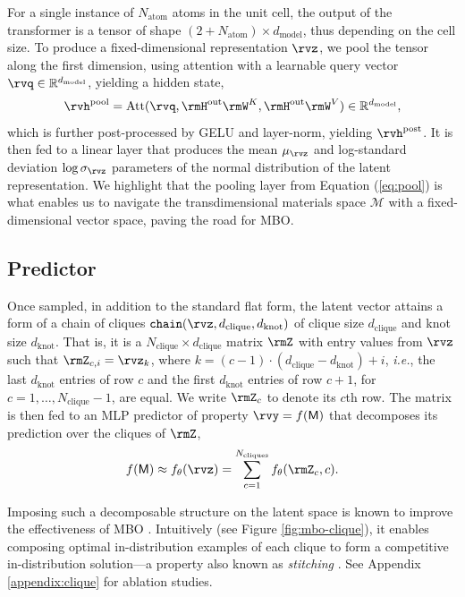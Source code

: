 \documentclass{article}
\theoremstyle{plain}
\theoremstyle{definition}
\theoremstyle{remark}
\begin{document}
For a single instance of $N_{\text{atom}}$ atoms in the unit cell, the output of the transformer is a tensor of shape $(2+N_{\text{atom}})\times d_{\text{model}}$, thus depending on the cell size. 
To produce a fixed-dimensional representation $\rvz$, we pool the tensor along the first dimension, using attention with a learnable query vector $\rvq\in\mathbb{R}^{d_{\text{model}}}$, yielding a hidden state,
\begin{align}   
    \label{eq:pool}
    \rvh^{\text{pool}} = \operatorname{Att}(\rvq, \rmH^{\text{out}}\rmW^{K}, \rmH^{\text{out}}\rmW^{V}) \in\mathbb{R}^{d_{\text{model}}},
\end{align}
which is further post-processed by GELU \citep{hendrycks2016gaussian} and layer-norm, yielding $\rvh^{\text{post}}$.
It is then fed to  a linear layer that produces the mean $\mu_{\rvz}$ and log-standard deviation $\log \sigma_{\rvz}$ parameters of the normal distribution of the latent representation.
We highlight that the pooling layer from Equation (\ref{eq:pool}) is what enables us to navigate the transdimensional materials space $\mathcal{M}$ with a fixed-dimensional vector space, paving the road for MBO.


\subsection{Predictor}
\label{sub:pred}
Once sampled, in addition to the standard flat form, the latent vector attains a form of a chain of cliques $\texttt{chain}(\rvz, d_{\text{clique}}, d_{\text{knot}})$ of clique size $d_{\text{clique}}$ and knot size $d_{\text{knot}}$. 
That is, it is a $N_{\text{clique}}\times d_{\text{clique}}$ matrix $\rmZ$ with entry values from $\rvz$ such that $\rmZ_{c,i}=\rvz_{k}$, where $k=(c-1)\cdot (d_{\text{clique}}-d_{\text{knot}}) + i$, \emph{i.e.}, the last $d_{\text{knot}}$ entries of row $c$ and the first $d_{\text{knot}}$ entries of row $c+1$, for $c=1, \dots, N_{\text{clique}}-1$, are equal.
We write $\rmZ_c$ to denote its $c$th row.
The matrix is then fed to an MLP predictor of property $\rvy=f(\mathsf{M})$ that decomposes its prediction over the cliques of $\rmZ$,
\begin{align}
    f(\mathsf{M}) \approx f_{\theta}(\rvz) = \sum_{c=1}^{N_{\text{cliques}}} f_{\theta}(\rmZ_{c}, c). \nonumber
    \vspace{-10pt}
\end{align}

Imposing such a decomposable structure on the latent space is known to improve the effectiveness of MBO \citep[\& Appendix \ref{sec:appendix-fgm}]{kuba2024cliqueformer}. 
Intuitively (see Figure \ref{fig:mbo-clique}), it enables composing optimal in-distribution examples of each clique to form a competitive in-distribution solution---a property also known as \emph{stitching} \citep{fu2020d4rl, shin2025treatment}.
See Appendix \ref{appendix:clique} for ablation studies.
\end{document}
